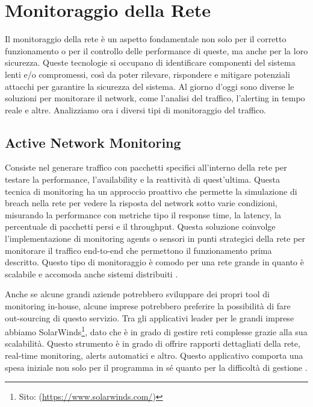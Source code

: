 \section{Monitoraggio della Rete}
    Il monitoraggio della rete è un aspetto fondamentale non solo per il corretto funzionamento o per il controllo delle performance di queste, ma anche per la loro sicurezza. Queste tecnologie si occupano di identificare componenti del sistema lenti e/o compromessi, così da poter rilevare, rispondere e mitigare potenziali attacchi per garantire la sicurezza del sistema. Al giorno d'oggi sono diverse le soluzioni per monitorare il network, come l'analisi del traffico, l'alerting in tempo reale e altre.
    Analizziamo ora i diversi tipi di monitoraggio del traffico.

    
    \subsection{Active Network Monitoring}
        Consiste nel generare traffico con pacchetti specifici all'interno della rete per testare la performance, l'availability e la reattività di quest'ultima. Questa tecnica di monitoring ha un approccio proattivo che permette la simulazione di breach nella rete per vedere la risposta del network sotto varie condizioni, misurando la performance con metriche tipo il response time, la latency, la percentuale di pacchetti persi e il throughput. Questa soluzione coinvolge l'implementazione di monitoring agents o sensori in punti strategici della rete per monitorare il traffico end-to-end che permettono il funzionamento prima descritto. Questo tipo di monitoraggio è comodo per una rete grande in quanto è scalabile e accomoda anche sistemi distribuiti \cite{paper_net_monitoring}.

        Anche se alcune grandi aziende potrebbero sviluppare dei propri tool di monitoring in-house, alcune imprese potrebbero preferire la possibilità di fare out-sourcing di questo servizio. Tra gli applicativi leader per le grandi imprese abbiamo SolarWinds\footnote{\label{solarwinds_site} Sito: (\url{https://www.solarwinds.com/})}, dato che è in grado di gestire reti complesse grazie alla sua scalabilità. Questo strumento è in grado di offrire rapporti dettagliati della rete, real-time monitoring, alerts automatici e altro. Questo applicativo comporta una spesa iniziale non solo per il programma in sé quanto per la difficoltà di gestione \cite{paper_net_monitoring}.

